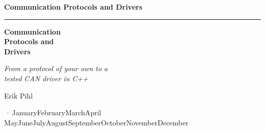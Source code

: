%
\providecommand{\bookversion}{}
\newcommand{\bookdate}{\number\day\space\ifcase\month\or January\or February\or March\or April\or
  May\or June\or July\or August\or September\or October\or November\or December\fi\space
  \number\year}
\newcommand{\bookedition}{\ifx\bookversion\empty\else\bookversion\,·\,\fi\bookdate}

\thispagestyle{empty}
\vspace*{2.2in}
\begin{flushright}
  {\Large\bfseries Communication Protocols and Drivers}
\end{flushright}
\cleardoublepage

\thispagestyle{empty}
\vspace*{1.1in}
\begin{flushleft}
  {\color{accent}\rule{0.9in}{2.5pt}}\par\vspace{1.4ex}
  {\fontsize{30}{36}\selectfont\bfseries Communication\\[0.15ex] Protocols and\\[0.15ex]
   Drivers\par}
  \vspace{2.2ex}
  {\Large\itshape From a protocol of your own to a\\tested CAN driver in C++\par}
  \vspace{1.0in}
  {\large Erik Pihl\par}
  \vfill
  {\small\color{muted} \bookedition\par}
\end{flushleft}
\newpage

